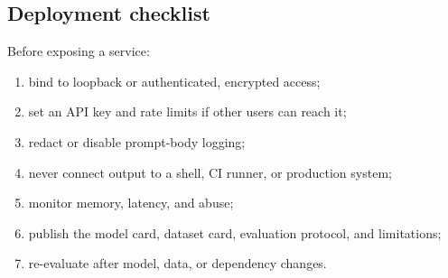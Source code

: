 \subsection{Deployment checklist}

Before exposing a \cyberlite{} service:

\begin{enumerate}[leftmargin=1.4em]
  \item bind to loopback or authenticated, encrypted access;
  \item set an API key and rate limits if other users can reach it;
  \item redact or disable prompt-body logging;
  \item never connect output to a shell, CI runner, or production system;
  \item monitor memory, latency, and abuse;
  \item publish the model card, dataset card, evaluation protocol, and
  limitations;
  \item re-evaluate after model, data, or dependency changes.
\end{enumerate}
